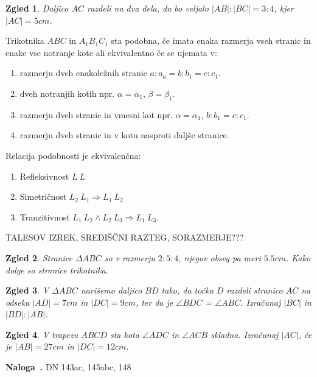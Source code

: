 \documentclass{article}
\newcounter{example}[section]
\newenvironment{example}[1][]{\refstepcounter{example}\par\medskip
   \noindent \textbf{Naloga~\theexample. #1} \rmfamily}{\medskip}
\newtheorem*{zgled}{Zgled}
\begin{document}
\begin{zgled}
    Daljico $AC$ razdeli na dva dela, da bo veljalo $|AB|:|BC|=3:4$, kjer $|AC|=5cm$.
\end{zgled}

Trikotnika $ABC$ in $A_1 B_1 C_1$ sta podobna, če imata enaka razmerja vseh stranic in enake vse notranje kote ali ekvivalentno če se ujemata v:
\begin{enumerate}[i]
    \item razmerju dveh enakoležnih stranic $a:a_a = b:b_1 =c: c_1$.
    \item dveh notranjih kotih npr. $\alpha = \alpha_1$, $\beta =\beta_1$.
    \item razmerju dveh stranic in vmesni kot npr. $\alpha =\alpha_1$, $b:b_1 = c: c_1$.
    \item razmerju dveh stranic in v kotu nasproti daljše stranice.
  \end{enumerate}

  Relacija podobnosti je ekvivalenčna:
  \begin{enumerate}[i]
    \item Refleksivnost $L~L$
    \item Simetričnost $L_2~L_1 \Rightarrow L_1 ~ L_2$
    \item Tranzitivnost $L_1 ~L_2 \land L_2 ~ L_3 \Rightarrow L_1 ~ L_3$.
  \end{enumerate}

  TALESOV IZREK, SREDIŠČNI RAZTEG, SORAZMERJE???


\begin{zgled}
    Stranice $\Delta ABC$ so v razmerju $2:5:4$, njegov obseg pa meri $5.5cm$. Kako dolge so stranice trikotnika.
\end{zgled}

\begin{zgled}
    V $\Delta ABC$ narišemo daljico $BD$ tako, da točka $D$ razdeli stranico $AC$ na odseka $|AD|=7cm$ in $|DC|=9cm$, ter da je $\angle BDC$ = $\angle ABC$. Izračunaj $|BC|$ in $|BD|:|AB|$.
\end{zgled}


\begin{zgled}
    V trapezu $ABCD$ sta kota $\angle ADC$ in $\angle ACB$ skladna. Izračunaj $|AC|$, če je $|AB|=27cm$ in $|DC|=12cm$.
\end{zgled}

\begin{example}
    DN 143ac, 145abc, 148
\end{example}
\end{document}
